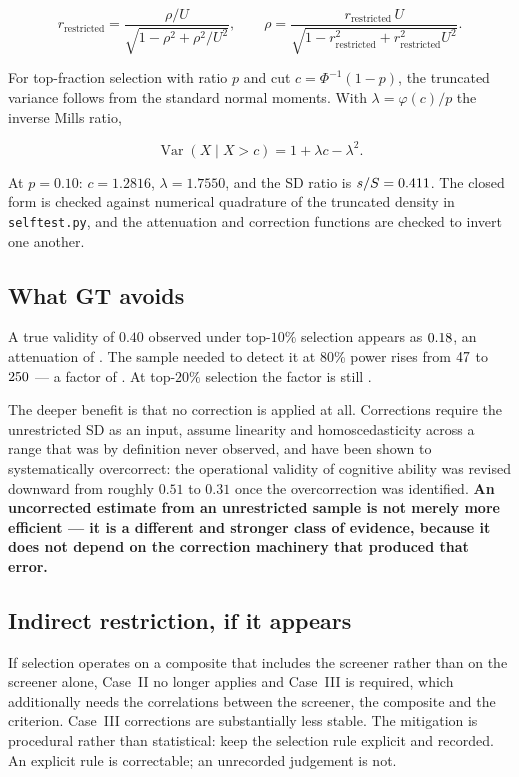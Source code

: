 \[
r_{\text{restricted}}
= \frac{\rho/U}{\sqrt{1-\rho^{2}+\rho^{2}/U^{2}}},
\qquad
\rho
= \frac{r_{\text{restricted}}\,U}{\sqrt{1-r_{\text{restricted}}^{2}+r_{\text{restricted}}^{2}U^{2}}} .
\]

For top-fraction selection with ratio $p$ and cut $c=\Phi^{-1}(1-p)$, the
truncated variance follows from the standard normal moments. With
$\lambda=\varphi(c)/p$ the inverse Mills ratio,

\[
\operatorname{Var}(X\mid X>c) = 1+\lambda c-\lambda^{2} .
\]

At $p=0.10$: $c=1.2816$, $\lambda=1.7550$, and the SD ratio is
$s/S=0.411$. The closed form is checked against numerical quadrature of
the truncated density in \texttt{selftest.py}, and the attenuation and
correction functions are checked to invert one another.

\subsection{What GT avoids}

A true validity of $0.40$ observed under top-$10\%$ selection appears as
$0.18$, an attenuation of \AttenuationTenPct{}. The sample
needed to detect it at 80\% power rises from $47$ to
$250$ --- a factor of \NmultiplierTen{}. At top-$20\%$ selection
the factor is still \NmultiplierTwenty{}.

The deeper benefit is that no correction is applied at all. Corrections require
the unrestricted SD as an input, assume linearity and homoscedasticity across a
range that was by definition never observed, and have been shown to
systematically overcorrect: the operational validity of cognitive ability was
revised downward from roughly $0.51$ to $0.31$ once the overcorrection was
identified. \textbf{An uncorrected estimate from an unrestricted sample is not
merely more efficient --- it is a different and stronger class of evidence,
because it does not depend on the correction machinery that produced that
error.}

\subsection{Indirect restriction, if it appears}

If selection operates on a composite that includes the screener rather than on
the screener alone, Case~II no longer applies and Case~III is required, which
additionally needs the correlations between the screener, the composite and the
criterion. Case~III corrections are substantially less stable. The mitigation is
procedural rather than statistical: keep the selection rule explicit and
recorded. An explicit rule is correctable; an unrecorded judgement is not.

